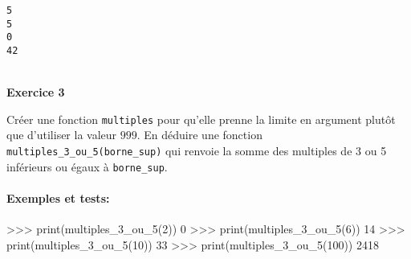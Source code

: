 \documentclass[a4paper,17pt]{extarticle}
\newenvironment{eleve}%
{\begin{activite}\color{noiramu}\\[-0.5cm]}
{\end{activite}}
\newenvironment{Shaded}{}{}
\newcommand{\DecValTok}[1]{\textcolor[rgb]{0.25,0.63,0.44}{{#1}}}
\newcommand{\NormalTok}[1]{{#1}}
\newcommand{\OperatorTok}[1]{\textcolor[rgb]{0.40,0.40,0.40}{{#1}}}
\newcommand{\BuiltInTok}[1]{{#1}}
\begin{document}
    \begin{Verbatim}[commandchars=\\\{\}]
5
5
0
42
    \end{Verbatim}
\begin{eleve}
    \textbf{Exercice 3}

Créer une fonction \texttt{multiples} pour qu'elle prenne la limite en
argument plutôt que d'utiliser la valeur \(999\). En déduire une
fonction \texttt{multiples\_3\_ou\_5(borne\_sup)} qui renvoie la somme
des multiples de 3 ou 5 inférieurs ou égaux à \texttt{borne\_sup}.

\hypertarget{exemples-et-tests}{%
\paragraph{Exemples et tests:}\label{exemples-et-tests}}

\begin{Shaded}
\begin{Highlighting}[]
\OperatorTok{\textgreater{}\textgreater{}\textgreater{}} \BuiltInTok{print}\NormalTok{(multiples\_3\_ou\_5(}\DecValTok{2}\NormalTok{))}
\DecValTok{0}
\OperatorTok{\textgreater{}\textgreater{}\textgreater{}} \BuiltInTok{print}\NormalTok{(multiples\_3\_ou\_5(}\DecValTok{6}\NormalTok{))}
\DecValTok{14}
\OperatorTok{\textgreater{}\textgreater{}\textgreater{}} \BuiltInTok{print}\NormalTok{(multiples\_3\_ou\_5(}\DecValTok{10}\NormalTok{))}
\DecValTok{33}
\OperatorTok{\textgreater{}\textgreater{}\textgreater{}} \BuiltInTok{print}\NormalTok{(multiples\_3\_ou\_5(}\DecValTok{100}\NormalTok{))}
\DecValTok{2418}
\end{Highlighting}
\end{Shaded}
        
        \end{eleve}
\end{document}
